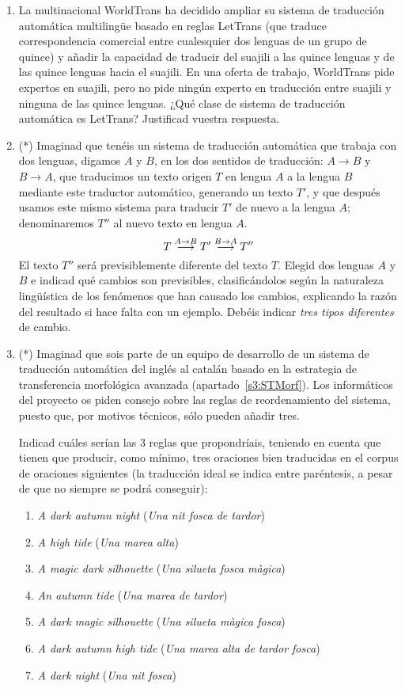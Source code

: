 \begin{enumerate}
\item La multinacional WorldTrans ha decidido ampliar su sistema de traducción automática multilingüe basado en reglas LetTrans (que traduce correspondencia comercial entre cualesquier dos lenguas de un grupo de quince) y añadir la capacidad de traducir del suajili a las quince lenguas y de las quince lenguas hacia el suajili. En una oferta de trabajo, WorldTrans pide expertos en suajili, pero no pide ningún experto en traducción entre suajili y ninguna de las quince lenguas. ¿Qué clase de sistema de traducción automática es LetTrans? Justificad vuestra respuesta. 

\item (*) Imaginad que tenéis un sistema de traducción automática que trabaja con dos lenguas, digamos $A$ y $B$, en los dos sentidos de traducción: $A{\rightarrow}B$ y $B{\rightarrow}A$, que traducimos un texto origen $T$ en lengua $A$ a la lengua $B$ mediante este traductor automático, generando un texto $T'$, y que después usamos este mismo sistema para traducir $T'$ de nuevo a la lengua $A$; denominaremos $T''$ al nuevo texto en lengua $A$. \begin{equation} T \stackrel{\scriptsize A\rightarrow B}{\longrightarrow}T'\stackrel{\scriptsize B\rightarrow A}{\longrightarrow} T'' \end{equation} El texto $T''$ será previsiblemente diferente del texto $T$. Elegid dos lenguas $A$ y $B$ e indicad qué cambios son previsibles, clasificándolos según la naturaleza lingüística de los fenómenos que han causado los cambios, explicando la razón del resultado si hace falta con un ejemplo. Debéis indicar \emph{tres tipos diferentes} de cambio. 

\item (*) Imaginad que sois parte de un equipo de desarrollo de un sistema de traducción automática del inglés al catalán basado en la estrategia de transferencia morfológica avanzada (apartado~\ref{s3:STMorf}). Los informáticos del proyecto os piden consejo sobre las reglas de reordenamiento del sistema, puesto que, por motivos técnicos, sólo pueden añadir tres. 

Indicad cuáles serían las 3 reglas que propondríais, teniendo en cuenta que tienen que producir, como mínimo, tres oraciones bien traducidas en el corpus de oraciones siguientes (la traducción ideal se indica entre paréntesis, a pesar de que no siempre se podrá conseguir): \begin{enumerate} \item \emph{A dark autumn night} (\emph{Una nit fosca de tardor}) \item \emph{A high tide} (\emph{Una marea alta}) \item \emph{A magic dark silhouette} (\emph{Una silueta fosca màgica}) \item \emph{An autumn tide} (\emph{Una marea de tardor}) \item \emph{A dark magic silhouette} (\emph{Una silueta màgica fosca}) \item \emph{A dark autumn high tide} (\emph{Una marea alta de tardor fosca}) \item \emph{A dark night} (\emph{Una nit fosca}) \end{enumerate} 


\end{enumerate}
